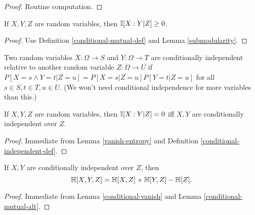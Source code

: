 \begin{proof}\leanok Routine computation.
\end{proof}

\begin{lemma}
\label{conditional-nonneg}
\leanok
If $X,Y,Z$ are random variables, then $\mathbb{I}[X:Y|Z] \ge 0$.
\end{lemma}
\begin{proof}
\leanok
Use Definition \ref{conditional-mutual-def} and Lemma \ref{submodularity}.
\end{proof}

\begin{definition}
\label{conditional-independent-def}
\leanok
  Two random variables $X: \Omega \to S$ and $Y: \Omega \to T$ are conditionally independent relative to another random variable $Z: \Omega \to U$ if $P[ X = s \wedge Y = t| Z=u] = P[X=s|Z=u] P[Y=t|Z=u]$ for all $s \in S, t \in T, u \in U$.  (We won't need conditional independence for more variables than this.)
\end{definition}

\begin{lemma}\label{conditional-vanish}
  \leanok
  If $X,Y,Z$ are random variables, then $\mathbb{I}[X:Y|Z] = 0$ iff $X,Y$ are conditionally independent over $Z$.
\end{lemma}

\begin{proof} \leanok Immediate from Lemma \ref{vanish-entropy} and Definition \ref{conditional-independent-def}.
\end{proof}

\begin{corollary}\label{cond-trial-ent}
  \leanok
  If $X, Y$ are conditionally independent over $Z$, then
  $$ \mathbb{H}[X,Y,Z] =\mathbb{H}[X,Z] + \mathbb{H}[Y,Z] - \mathbb{H}[Z].$$
\end{corollary}

\begin{proof} \leanok Immediate from Lemma \ref{conditional-vanish} and Lemma \ref{conditional-mutual-alt}.
\end{proof}
